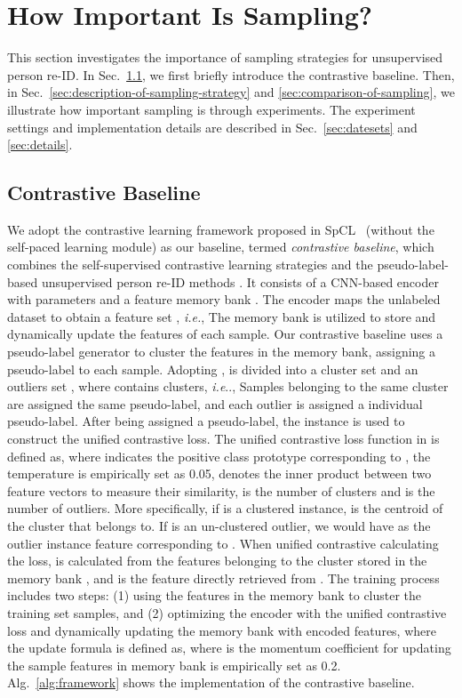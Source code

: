 \documentclass[lettersize,journal]{IEEEtran}
\makeatletter
\DeclareRobustCommand\onedot{\futurelet\@let@token\@onedot}
\def\@onedot{\ifx\@let@token.\else.\null\fi\xspace}
\def\ie{\emph{i.e}\onedot} \def\Ie{\emph{I.e}\onedot}
\makeatother
\begin{document}
\section{How Important Is Sampling?}

This section investigates the importance of sampling strategies for unsupervised person re-ID. In Sec.~\ref{sec:baseline-framework}, we first briefly introduce the contrastive baseline. Then, in Sec.~\ref{sec:description-of-sampling-strategy} and \ref{sec:comparison-of-sampling}, we illustrate how important sampling is through experiments. The experiment settings and implementation details are described in Sec.~\ref{sec:datesets} and \ref{sec:details}.

\subsection{Contrastive Baseline}
\label{sec:baseline-framework}
We adopt the contrastive learning framework proposed in SpCL~\cite{SpCL} (without the self-paced learning module) as our baseline, termed \emph{contrastive baseline}, which combines the self-supervised contrastive learning strategies \cite{memorybank,CMC,Moco,SimCLR} and the pseudo-label-based unsupervised person re-ID methods \cite{SpCL,HCT,MMCL,CAP,ICE,DSCE,IICS}. 
It consists of a CNN-based encoder  with parameters  and a feature memory bank . The encoder maps the unlabeled dataset  to obtain a feature set , \emph{i.e.},
The memory bank  is utilized to store and dynamically update the features of each sample.
Our contrastive baseline uses a pseudo-label generator  to cluster the features in the memory bank, assigning a pseudo-label to each sample.
Adopting ,  is divided into a cluster set  and an outliers set , where  contains  clusters, \ie,
Samples belonging to the same cluster are assigned the same pseudo-label, and each outlier is assigned a individual pseudo-label.
After being assigned a pseudo-label, the instance is used to construct the unified contrastive loss. The unified contrastive loss function in \cite{SpCL} is defined as,
where  indicates the positive class prototype corresponding to , the temperature  is empirically set as 0.05,  denotes the inner product between two feature vectors to measure their similarity,  is the number of clusters and  is the number of outliers.
More specifically, if  is a clustered instance,  is the centroid of the cluster  that  belongs to. If  is an un-clustered outlier, we would have  as the outlier instance feature corresponding to . When unified contrastive calculating the loss,  is calculated from the features belonging to the cluster  stored in the memory bank , and  is the feature directly retrieved from .
The training process includes two steps: (1) using the features in the memory bank to cluster the training set samples, and (2) optimizing the encoder with the unified contrastive loss and dynamically updating the memory bank with encoded features, where the update formula is defined as,
where  is the momentum coefficient for updating the sample features in memory bank is empirically set as 0.2. Alg.~\ref{alg:framework} shows the implementation of the contrastive baseline.
\end{document}
